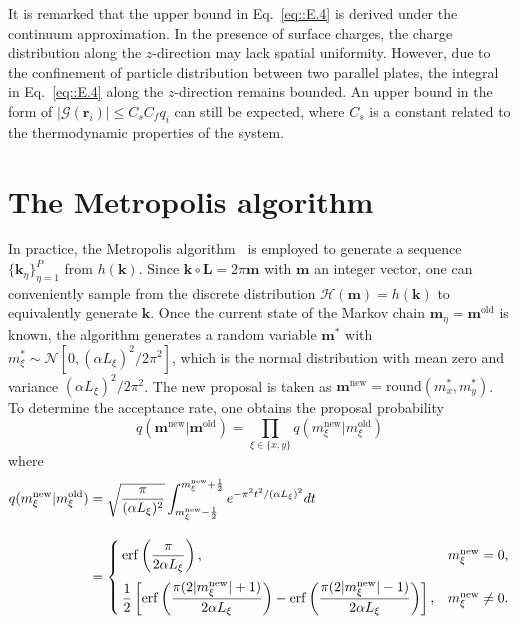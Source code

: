 It is remarked that the upper bound in Eq.~\eqref{eq::E.4} is derived under the continuum approximation. In the presence of surface charges, the charge distribution along the $z$-direction may lack spatial uniformity. However, due to the confinement of particle distribution between two parallel plates, the integral in Eq.~\eqref{eq::E.4} along the $z$-direction remains bounded. An upper bound in the form of $|\mathscr{G}(\bm{r}_i)|\leq C_s C_{f}q_i$ can still be expected, where $C_s$ is a constant related to the thermodynamic properties of the system.

\section{The Metropolis algorithm} \label{app::Metropolis}

In practice, the Metropolis algorithm~\cite{metropolis1953equation, hastings1970monte} is employed to generate a sequence $\{\bm{k}_{\eta}\}_{\eta=1}^{P}$ from $h(\bm{k})$. 
Since $\bm{k}\circ \bm{L}=2\pi \bm{m}$ with $\bm{m}$ an integer vector, one can conveniently sample from the discrete distribution $\mathcal{H}(\bm{m})=h(\bm{k})$ to equivalently generate $\bm{k}$. 
Once the current state of the Markov chain $\bm{m}_{\eta}=\bm{m}^{\text{old}}$ is known, the algorithm generates a random variable $\bm{m}^*$ with $m_{\xi}^*\sim \mathcal{N}[0,(\alpha L_{\xi})^2/2\pi^2]$, which is the normal distribution with mean zero and variance $(\alpha L_{\xi})^2/2\pi^2$. The new proposal is taken as $\bm{m}^{\text{new}}=\text{round}(m_{x}^*,m_{y}^*)$. To determine the acceptance rate, one obtains the proposal probability 
\begin{equation}
	q(\bm{m}^{\text{new}}|\bm{m}^{\text{old}})=\prod_{\xi\in\{x,y\}}q(m^{\text{new}}_{\xi}|m^{\text{old}}_{\xi})
\end{equation}
where
\begin{equation}
	\begin{split}
		q(m^{\text{new}}_{\xi}|m^{\text{old}}_{\xi})&=\sqrt{\frac{\pi}{(\alpha L_{\xi})^2}}\int_{m^{\text{new}}_{\xi}-\frac{1}{2}}^{m^{\text{new}}_{\xi}+\frac{1}{2}}e^{-\pi^2t^2/(\alpha L_{\xi})^2}dt\\[1em]
		&=\begin{cases}
			\operatorname{erf}\left(\dfrac{\pi}{2\alpha L_{\xi}}\right),&m_{\xi}^{\text{new}}=0,\\[1.15em]
			\dfrac{1}{2}\left[\operatorname{erf}\left(\dfrac{\pi(2|m_{\xi}^{\text{new}}|+1)}{2\alpha L_{\xi}}\right)-\operatorname{erf}\left(\dfrac{\pi(2|m_{\xi}^{\text{new}}|-1)}{2\alpha L_{\xi}}\right)\right],&m_{\xi}^{\text{new}}\neq 0.
		\end{cases}
	\end{split}
\end{equation}

